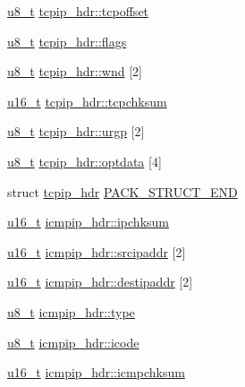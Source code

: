 \begin{DoxyCompactItemize}
\item 
\hyperlink{group__uipfw_ga4caecabca98b43919dd11be1c0d4cd8e}{u8\_\-t} \hyperlink{group__uipfw_gaec07fa9add3c0a172516e0ec66810ac4}{tcpip\_\-hdr::tcpoffset}
\item 
\hyperlink{group__uipfw_ga4caecabca98b43919dd11be1c0d4cd8e}{u8\_\-t} \hyperlink{group__uipfw_ga5699a8989a6d01adf59c4984cae06a67}{tcpip\_\-hdr::flags}
\item 
\hyperlink{group__uipfw_ga4caecabca98b43919dd11be1c0d4cd8e}{u8\_\-t} \hyperlink{group__uipfw_ga8da4793ac511e68c37ad2dcfd37c639b}{tcpip\_\-hdr::wnd} \mbox{[}2\mbox{]}
\item 
\hyperlink{group__uipfw_ga77570ac4fcab86864fa1916e55676da2}{u16\_\-t} \hyperlink{group__uipfw_ga711271ced4443aa908b161ccde1a9de4}{tcpip\_\-hdr::tcpchksum}
\item 
\hyperlink{group__uipfw_ga4caecabca98b43919dd11be1c0d4cd8e}{u8\_\-t} \hyperlink{group__uipfw_gadee52ce29db507d7d12185a0e9388b51}{tcpip\_\-hdr::urgp} \mbox{[}2\mbox{]}
\item 
\hyperlink{group__uipfw_ga4caecabca98b43919dd11be1c0d4cd8e}{u8\_\-t} \hyperlink{group__uipfw_ga1db8d3a6459a09cd08315c3d131ac982}{tcpip\_\-hdr::optdata} \mbox{[}4\mbox{]}
\item 
struct \hyperlink{structtcpip__hdr}{tcpip\_\-hdr} \hyperlink{group__uipfw_gafe7e75cc45d2b325aaaf5d0042e8bfd8}{PACK\_\-STRUCT\_\-END}
\item 
\hyperlink{group__uipfw_ga77570ac4fcab86864fa1916e55676da2}{u16\_\-t} \hyperlink{group__uipfw_ga937e9a7c3241a3db558d51ade5d5336d}{icmpip\_\-hdr::ipchksum}
\item 
\hyperlink{group__uipfw_ga77570ac4fcab86864fa1916e55676da2}{u16\_\-t} \hyperlink{group__uipfw_ga50b8789dde802ca4ed0a4a81949d8397}{icmpip\_\-hdr::srcipaddr} \mbox{[}2\mbox{]}
\item 
\hyperlink{group__uipfw_ga77570ac4fcab86864fa1916e55676da2}{u16\_\-t} \hyperlink{group__uipfw_gaf0f2e793d08337d303a01ef9ce681a86}{icmpip\_\-hdr::destipaddr} \mbox{[}2\mbox{]}
\item 
\hyperlink{group__uipfw_ga4caecabca98b43919dd11be1c0d4cd8e}{u8\_\-t} \hyperlink{group__uipfw_gacd2da996a99d67c9bd3d19d619206087}{icmpip\_\-hdr::type}
\item 
\hyperlink{group__uipfw_ga4caecabca98b43919dd11be1c0d4cd8e}{u8\_\-t} \hyperlink{group__uipfw_gaf4ca6ef37e95662c8cb40bc373d52b50}{icmpip\_\-hdr::icode}
\item 
\hyperlink{group__uipfw_ga77570ac4fcab86864fa1916e55676da2}{u16\_\-t} \hyperlink{group__uipfw_ga25d4408e0b5b761b331e77a0a9b38808}{icmpip\_\-hdr::icmpchksum}

\end{DoxyCompactItemize}
